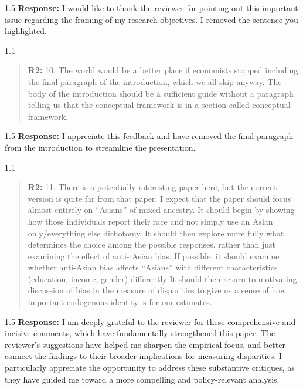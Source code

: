 \documentclass[12pt,english]{article}
\newcommand{\rrquote}{1.1}
\newcommand{\rrxspc}{1.5}
\begin{document}
\begin{refsection}
        \begin{spacing}{\rrxspc}
           \textbf{Response:} I would like to thank the reviewer for pointing out this important issue regarding the framing of my research objectives. I removed the sentence you highlighted.
    \end{spacing}

    \begin{spacing}{\rrquote}
        \begin{quotation}
        \textbf{R2: } 10. The world would be a better place if economists stopped including the final paragraph of the introduction, which we all skip anyway. The body of the introduction should be a sufficient guide without a paragraph telling us that the conceptual framework is in a section called conceptual framework.
        \end{quotation}
        \end{spacing}
        
        \begin{spacing}{\rrxspc}
           \textbf{Response:} I appreciate this feedback and have removed the final paragraph from the introduction to streamline the presentation.
    \end{spacing}

    \begin{spacing}{\rrquote}
        \begin{quotation}
        \textbf{R2: } 11. There is a potentially interesting paper here, but the current version is quite far from that paper. I expect that the paper should focus almost entirely on “Asians” of mixed ancestry. It should begin by showing how those individuals report their race and not simply use an Asian only/everything else dichotomy. It should then explore more fully what determines the choice among the possible responses, rather than just examining the effect of anti- Asian bias. If possible, it should examine whether anti-Asian bias affects “Asians” with different characteristics (education, income, gender) differently It should then return to motivating discussion of bias in the measure of disparities to give us a sense of how important endogenous identity is for our estimates.
        \end{quotation}
        \end{spacing}
        
        \begin{spacing}{\rrxspc}
        \textbf{Response:} I am deeply grateful to the reviewer for these comprehensive and incisive comments, which have fundamentally strengthened this paper. The reviewer's suggestions have helped me sharpen the empirical focus, and better connect the findings to their broader implications for measuring disparities. I particularly appreciate the opportunity to address these substantive critiques, as they have guided me toward a more compelling and policy-relevant analysis.
        

\end{spacing}
\end{refsection}
\end{document}
